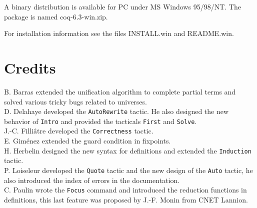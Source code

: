 \documentclass[11pt]{article}
\begin{document}
A binary distribution is available for PC under MS Windows 95/98/NT.
The package is named coq-6.3-win.zip.

For installation information see the 
files INSTALL.win and README.win.



\section{Credits}
B. Barras extended the unification algorithm to complete partial terms
and solved various tricky bugs related to universes.\\
D. Delahaye developed the \texttt{AutoRewrite} tactic. He also designed the new
behavior of \texttt{Intro} and provided the tacticals \texttt{First} and
\texttt{Solve}.\\
J.-C. Filli\^atre developed the \texttt{Correctness} tactic.\\
E. Gim\'enez extended the guard condition in fixpoints.\\
H. Herbelin designed the new syntax for definitions and extended the
\texttt{Induction} tactic.\\
P. Loiseleur developed the \texttt{Quote} tactic and 
the new design of the \texttt{Auto}
tactic, he also introduced the index of
errors in the documentation.\\
C. Paulin wrote the \texttt{Focus} command and introduced 
the reduction functions in definitions, this last feature 
was proposed by J.-F. Monin from CNET Lannion. 
\end{document}
